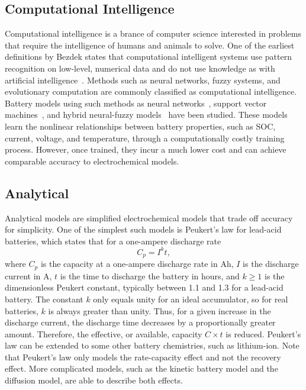 \documentclass[../zhang_thesis.tex]{subfiles}
\begin{document}
\subsection{Computational Intelligence}

Computational intelligence is a brance of computer science interested in problems that require the intelligence of humans and animals to solve. One of the earliest definitions by Bezdek states that computational intelligent systems use pattern recognition on low-level, numerical data and do not use knowledge as with artificial intelligence~\cite{bezdek92,bezdek94}. Methods such as neural networks, fuzzy systems, and evolutionary computation are commonly classified as computational
intelligence. Battery models using such methods as neural networks~\cite{ogorman98,capizzi11}, support vector machines~\cite{wang06}, and hybrid neural-fuzzy models~\cite{shen02} have been studied. These models learn the nonlinear relationships between battery properties, such as SOC, current, voltage, and temperature, through a computationally costly training process. However, once trained, they incur a much lower cost and can achieve comparable accuracy to electrochemical
models.

\subsection{Analytical}

Analytical models are simplified electrochemical models that trade off accuracy for simplicity. One of the simplest such models is Peukert's law for lead-acid batteries, which states that for a one-ampere discharge rate~\cite{doerffel06}
\begin{equation}
C_p = I^k t,
\end{equation}
where $C_p$ is the capacity at a one-ampere discharge rate in Ah, $I$ is the discharge current in A, $t$ is the time to discharge the battery in hours, and $k\ge 1$ is the dimensionless Peukert constant, typically between 1.1 and 1.3 for a lead-acid battery. The constant $k$ only equals unity for an ideal accumulator, so for real batteries, $k$ is always greater than unity. Thus, for a given increase in the discharge current, the discharge time decreases by a proportionally greater
amount. Therefore, the effective, or available, capacity $C\times t$ is reduced. Peukert's law can be extended to some other battery chemistries, such as lithium-ion. Note that Peukert's law only models the rate-capacity effect and not the recovery effect. More complicated models, such as the kinetic battery model and the diffusion model, are able to describe both effects.
\end{document}
